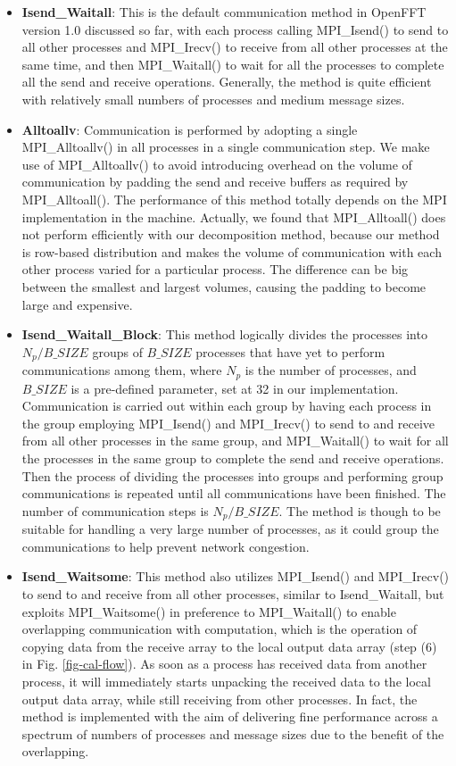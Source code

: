 \begin{itemize}
\item
\textbf{Isend\_Waitall}: This is the default communication method in OpenFFT version 1.0 discussed so far, with each process calling MPI\_Isend() to send to all other processes and MPI\_Irecv() to receive from all other processes at the same time, and then MPI\_Waitall() to wait for all the processes to complete all the send and receive operations. Generally, the method is quite efficient with relatively small numbers of processes and medium message sizes. 
\item
\textbf{Alltoallv}: Communication is performed by adopting a single MPI\_Alltoallv() in all processes in a single communication step. We make use of MPI\_Alltoallv() to avoid introducing overhead on the volume of communication by padding the send and receive buffers as required by MPI\_Alltoall(). The performance of this method totally depends on the MPI implementation in the machine. Actually, we found that MPI\_Alltoall() does not perform efficiently with our decomposition method, because our method is row-based distribution and makes the volume of communication with each other process varied for a particular process. The difference can be big between the smallest and largest volumes, causing the padding to become large and expensive. \item
\textbf{Isend\_Waitall\_Block}: This method logically divides the processes into $N_p/B\_{SIZE}$ groups of $B\_{SIZE}$ processes that have yet to perform communications among them, where $N_p$ is the number of processes, and $B\_{SIZE}$ is a pre-defined parameter, set at 32 in our implementation. Communication is carried out within each group by having each process in the group employing MPI\_Isend() and MPI\_Irecv() to send to and receive from all other processes in the same group, and MPI\_Waitall() to wait for all the processes in the same group to complete the send and receive operations. Then the process of dividing the processes into groups and performing group communications is repeated until all communications have been finished. The number of communication steps is $N_p/B\_{SIZE}$. The method is though to be suitable for handling a very large number of processes, as it could group the communications to help prevent network congestion.   
\item
\textbf{Isend\_Waitsome}: This method also utilizes MPI\_Isend() and MPI\_Irecv() to send to and receive from all other processes, similar to Isend\_Waitall, but exploits MPI\_Waitsome() in preference to MPI\_Waitall() to enable overlapping communication with computation, which is the operation of copying data from the receive array to the local output data array (step (6) in Fig. \ref{fig-cal-flow}). As soon as a process has received data from another process, it will immediately starts unpacking the received data to the local output data array, while still receiving from other processes. In fact, the method is implemented with the aim of delivering fine performance across a spectrum of numbers of processes and message sizes due to the benefit of the overlapping.  

\end{itemize}
